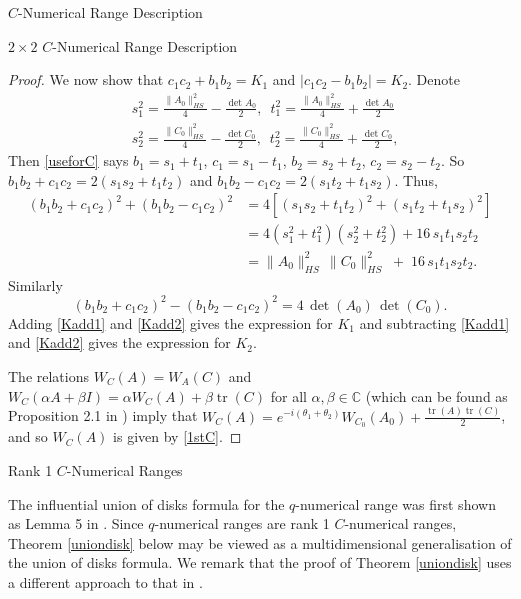 \documentclass[12pt]{article}
\theoremstyle{plain}
\theoremstyle{definition}
\theoremstyle{remark}
\numberwithin{equation}{section}
\begin{document}
\begin{section}{$C$-Numerical Range Description}
\begin{subsection}{$2 \times 2$ $C$-Numerical Range Description}
\begin{proof}
We now show that $c_1c_2 + b_1b_2 = K_1$ and $|c_1c_2 - b_1b_2| = K_2$.
Denote
\begin{align}\label{st}
&s_1^2=\frac{\|A_0\|_{HS}^2}{4}-\frac{\det A_0}{2}, \, \, \, 
t_1^2=\frac{\|A_0\|_{HS}^2}{4}+\frac{\det A_0}{2} \\
&s_2^2=\frac{\|C_0\|_{HS}^2}{4}-\frac{\det C_0}{2}, \, \, \, 
t_2^2=\frac{\|C_0\|_{HS}^2}{4}+\frac{\det C_0}{2},
\end{align}
Then \eqref{useforC} says \(b_1=s_1+t_1\), \(c_1=s_1-t_1\), \(b_2=s_2+t_2\), \(c_2=s_2-t_2\). So $b_1b_2+c_1c_2 =2(s_1s_2+t_1t_2)$ and $b_1b_2-c_1c_2 =2(s_1t_2+t_1s_2).$ Thus,
\begin{align}
(b_1b_2+c_1c_2)^2+(b_1b_2-c_1c_2)^2
&=4\!\left[(s_1s_2+t_1t_2)^2+(s_1t_2+t_1s_2)^2\right]\\
&=4(s_1^2+t_1^2)(s_2^2+t_2^2)+16\,s_1t_1s_2t_2\\
&=\|A_0\|_{HS}^2\,\|C_0\|_{HS}^2
\;+\;16\,s_1t_1s_2t_2. \label{Kadd1}
\end{align}
Similarly \begin{equation}\label{Kadd2}
    (b_1b_2+c_1c_2)^2-(b_1b_2-c_1c_2)^2 =4\,\det(A_0)\,\det(C_0).
\end{equation}
Adding \eqref{Kadd1} and \eqref{Kadd2} gives the expression for $K_1$ and subtracting \eqref{Kadd1} and \eqref{Kadd2} gives the expression for $K_2$.






The relations $W_C(A)= W_A(C)$ and $W_C(\alpha A + \beta I) =\alpha W_C(A) + \beta \operatorname{tr}(C)$ for all $\alpha , \beta \in \mathbb{C}$ (which can be found as Proposition 2.1 in \cite{gau2021numerical}) imply that $W_C(A) = e^{-i ( \theta_1 + \theta_2)}W_{C_0}(A_0) + \frac{\operatorname{tr}(A) \operatorname{tr}(C)}{2}$, and so $W_C(A)$ is given by \eqref{1stC}.
\end{proof}
\end{subsection}







\begin{subsection}{Rank 1 $C$-Numerical Ranges}\label{3.2}

The influential union of disks formula for the $q$-numerical range was first shown as Lemma 5 in \cite{tsing1984constrained}. Since $q$-numerical ranges are rank 1 $C$-numerical ranges, Theorem \ref{uniondisk} below may be viewed as a multidimensional generalisation of the union of disks formula. We remark that the proof of Theorem \ref{uniondisk} uses a different approach to that in \cite{tsing1984constrained}.












\end{subsection}
\end{section}
\end{document}
